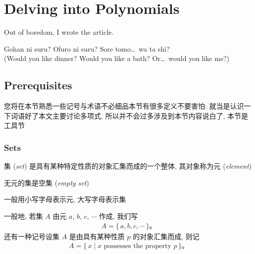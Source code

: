\def\CC{\mathbb{C}}
\def\RR{\mathbb{R}}
\def\QQ{\mathbb{Q}}
\def\ZZ{\mathbb{Z}}
\def\NN{\mathbb{N}}
\def\FF{\mathbb{F}}
\def\ii{\mathrm{i}}
\def\myStar{\ding{72}}
\def\ellipsis{\dots}
\def\period{\text{。}}
\def\qedsymbol{\ding{44}}

\section*{Delving into Polynomials}

Out of boredom, I wrote the article.

\begin{foobar}
    Gohan ni suru? Ofuro ni suru? Sore tomo\ellipsis \ wa ta shi? \\
    (Would you like dinner? Would you like a bath? Or\ellipsis \ would you like me?)
\end{foobar}

\clearpage

\subsection*{Prerequisites}

您将在本节熟悉一些记号与术语\period 不必细品\period 本节有很多定义\period 不要害怕: 就当是认识一下词语好了\period 本文主要讨论多项式, 所以并不会过多涉及到本节内容\period 说白了, 本节是工具节\period

\subsubsection*{Sets}

\begin{definition}
    集 (\textit{set}) 是具有某种特定性质的对象汇集而成的一个整体, 其对象称为元 (\textit{element})\period
\end{definition}

\begin{definition}
    无元的集是空集 (\textit{empty set})\period
\end{definition}

\begin{remark}
    一般用小写字母表示元, 大写字母表示集\period
\end{remark}

\begin{definition}
    一般地, 若集 $A$ 由元 $a$, $b$, $c$, $\cdots$ 作成, 我们写
    \begin{align*}
        A = \{\, a,b,c,\cdots \,\} \period
    \end{align*}
    还有一种记号\period 设集 $A$ 是由具有某种性质 $p$ 的对象汇集而成, 则记
    \begin{align*}
        A = \{\, x \mid x \text{ possesses the property } p \,\} \period
    \end{align*}
\end{definition}

